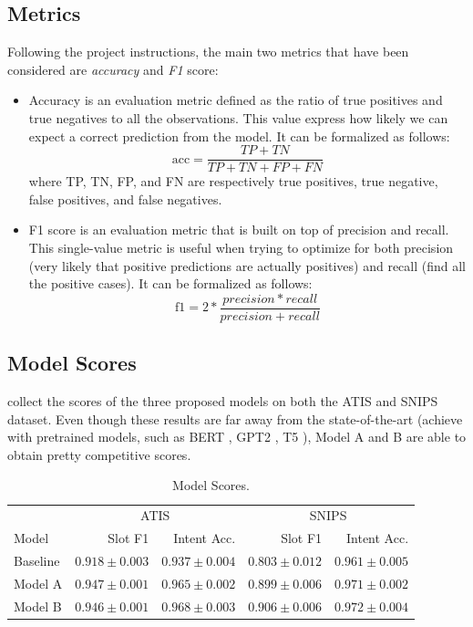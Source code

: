 \documentclass[a4paper]{article}
\begin{document}
\subsection{Metrics}
Following the project instructions, the main two metrics that have been considered are \emph{accuracy} and \emph{F1} score:
\begin{itemize}
    \item Accuracy is an evaluation metric defined as the ratio of true positives and true negatives to all the observations. This value express how likely we can expect a correct prediction from the model. It can be formalized as follows:
    \begin{equation*}
        \textrm{acc} = \frac{TP + TN}{TP + TN + FP + FN}
    \end{equation*}
    where TP, TN, FP, and FN are respectively true positives, true negative, false positives, and false negatives.
    \item F1 score is an evaluation metric that is built on top of precision and recall. This single-value metric is useful when trying to optimize for both precision (very likely that positive predictions are actually positives) and recall (find all the positive cases). It can be formalized as follows:
    \begin{equation*}
        \textrm{f1} = 2 * \frac{precision * recall}{precision + recall}
    \end{equation*}
\end{itemize}

\subsection{Model Scores}
 collect the scores of the three proposed models on both the ATIS and SNIPS dataset. Even though these results are far away from the state-of-the-art (achieve with pretrained models, such as BERT \cite{DBLP:journals/corr/abs-1810-04805}, GPT2 \cite{Radford2019LanguageMA}, T5 \cite{DBLP:journals/corr/abs-1910-10683}), Model A and B are able to obtain pretty competitive scores.

\begin{table}[!t]
    \centering
    \begin{tabular}{lrrrr}
        \toprule
            & \multicolumn{2}{c}{ATIS} & \multicolumn{2}{c}{SNIPS} \\
            Model & Slot F1  & Intent Acc. & Slot F1 & Intent Acc.\\
        \midrule
            Baseline & $0.918 \pm 0.003$ & $0.937 \pm 0.004$ & $0.803 \pm 0.012$ & $0.961 \pm 0.005$ \vspace{0.2cm}\\
            Model A & $\mathbf{0.947 \pm 0.001}$ & $0.965 \pm 0.002$ & $0.899 \pm 0.006$ & $0.971 \pm 0.002$ \vspace{0.2cm}\\
            Model B & $0.946 \pm 0.001$ & $\mathbf{0.968 \pm 0.003}$ & $\mathbf{0.906 \pm 0.006}$ & $\mathbf{0.972 \pm 0.004}$ \\
        \bottomrule
    \end{tabular}
    \caption{Model Scores.}
    \label{tab:model-score}
\end{table}
\end{document}
